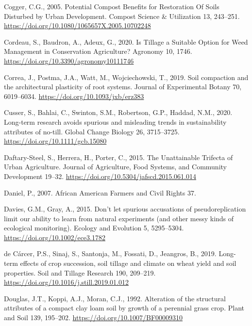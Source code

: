 \documentclass[
  12pt,
]{article}
\newlength{\cslhangindent}
\newlength{\cslentryspacingunit} %
\newenvironment{CSLReferences}[2] %
 {%
  \setlength{\parindent}{0pt}
  \ifodd #1
  \let\oldpar\par
  \def\par{\hangindent=\cslhangindent\oldpar}
  \fi
  \setlength{\parskip}{#2\cslentryspacingunit}
 }%
 {}
\begin{document}
\begin{CSLReferences}{1}{0}
\leavevmode{}%
Cogger, C.G., 2005. Potential {Compost Benefits} for {Restoration Of Soils Disturbed} by {Urban Development}. Compost Science \& Utilization 13, 243--251. \url{https://doi.org/10.1080/1065657X.2005.10702248}

\leavevmode{}%
Cordeau, S., Baudron, A., Adeux, G., 2020. Is {Tillage} a {Suitable Option} for {Weed Management} in {Conservation Agriculture}? Agronomy 10, 1746. \url{https://doi.org/10.3390/agronomy10111746}

\leavevmode{}%
Correa, J., Postma, J.A., Watt, M., Wojciechowski, T., 2019. Soil compaction and the architectural plasticity of root systems. Journal of Experimental Botany 70, 6019--6034. \url{https://doi.org/10.1093/jxb/erz383}

\leavevmode{}%
Cusser, S., Bahlai, C., Swinton, S.M., Robertson, G.P., Haddad, N.M., 2020. Long-term research avoids spurious and misleading trends in sustainability attributes of no-till. Global Change Biology 26, 3715--3725. \url{https://doi.org/10.1111/gcb.15080}

\leavevmode{}%
Daftary-Steel, S., Herrera, H., Porter, C., 2015. The {Unattainable Trifecta} of {Urban Agriculture}. Journal of Agriculture, Food Systems, and Community Development 19--32. \url{https://doi.org/10.5304/jafscd.2015.061.014}

\leavevmode{}%
Daniel, P., 2007. African {American Farmers} and {Civil Rights} 37.

\leavevmode{}%
Davies, G.M., Gray, A., 2015. Don't let spurious accusations of pseudoreplication limit our ability to learn from natural experiments (and other messy kinds of ecological monitoring). Ecology and Evolution 5, 5295--5304. \url{https://doi.org/10.1002/ece3.1782}

\leavevmode{}%
de Cárcer, P.S., Sinaj, S., Santonja, M., Fossati, D., Jeangros, B., 2019. Long-term effects of crop succession, soil tillage and climate on wheat yield and soil properties. Soil and Tillage Research 190, 209--219. \url{https://doi.org/10.1016/j.still.2019.01.012}

\leavevmode{}%
Douglas, J.T., Koppi, A.J., Moran, C.J., 1992. Alteration of the structural attributes of a compact clay loam soil by growth of a perennial grass crop. Plant and Soil 139, 195--202. \url{https://doi.org/10.1007/BF00009310}


\end{CSLReferences}
\end{document}
